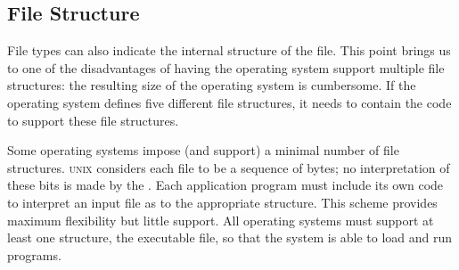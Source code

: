 \subsection{File Structure}\label{subsec:File_Structure}
File types can also indicate the internal structure of the file.
This point brings us to one of the disadvantages of having the operating system support multiple file structures: the resulting size of the operating system is cumbersome.
If the operating system defines five different file structures, it needs to contain the code to support these file structures.

Some operating systems impose (and support) a minimal number of file structures.
\textsc{unix} considers each file to be a sequence of bytes; no interpretation of these bits is made by the \textbf{}.
Each application program must include its own code to interpret an input file as to the appropriate structure.
This scheme provides maximum flexibility but little support.
All operating systems must support at least one structure, the executable file, so that the system is able to load and run programs.


